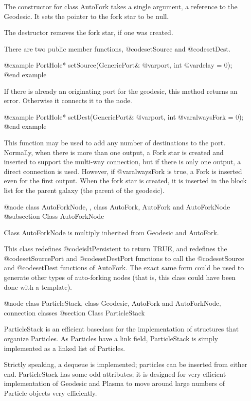 The constructor for class AutoFork takes a single argument, a reference
to the Geodesic.  It sets the pointer to the fork star to be null.

The destructor removes the fork star, if one was created.

There are two public member functions, @code{setSource} and
@code{setDest}.

@example
PortHole* setSource(GenericPort& @var{port}, int @var{delay} = 0);
@end example

If there is already an originating port for the geodesic, this method
returns an error.  Otherwise it connects it to the node.

@example
PortHole* setDest(GenericPort& @var{port}, int @var{alwaysFork} = 0);
@end example

This function may be used to add any number of destinations to the
port.  Normally, when there is more than one output, a Fork star is
created and inserted to support the multi-way connection, but if there
is only one output, a direct connection is used.  However, if
@var{alwaysFork} is true, a Fork is inserted even for the first output.
When the fork star is created, it is inserted in the block list for
the parent galaxy (the parent of the geodesic).

@node class AutoForkNode,  , class AutoFork, AutoFork and AutoForkNode
@subsection Class AutoForkNode

Class AutoForkNode is multiply inherited from Geodesic and AutoFork.

This class redefines @code{isItPersistent} to return TRUE, and redefines
the @code{setSourcePort} and @code{setDestPort} functions to call the
@code{setSource} and @code{setDest} functions of AutoFork.
The exact same form could be used to generate other types of
auto-forking nodes (that is, this class could have been done with
a template).

@node class ParticleStack, class Geodesic, AutoFork and AutoForkNode, connection classes
@section Class ParticleStack

ParticleStack is an efficient baseclass for the implementation of
structures that organize Particles.  As Particles have a link field,
ParticleStack is simply implemented as a linked list of Particles.

Strictly speaking, a dequeue is implemented; particles can be inserted
from either end.  ParticleStack has some odd attributes; it is designed
for very efficient implementation of Geodesic and Plasma to move around
large numbers of Particle objects very efficiently.

